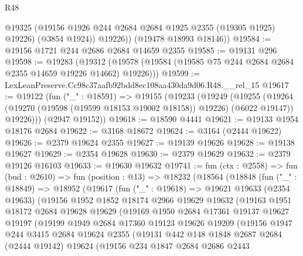 \begin{lexlean}{R48}
\begin{coremodule}
            @19325
            (@19156 @1926 @244 @2684 @2684 @1925 @2355 (@19305 @1925) @19226)
            (@3854 @1924))
          @19226))
      (@19478 @18993 @18146))
@19584 := @19156 @1721 @244 @2686 @2684 @14659 @2355
@19585 := @19131 @296
@19598 := @19283
    (@19312 (@19578 (@19584 (@19585 @75 @244 @2684 @2684 @2355 @14659 @19226 @14662) @19226)))
@19599 := LexLeanPreserve.Cc98c37aafb92bdd8ec108aa430da9d06.R48.__rel_15
@19617 := @19122
    (fun ("_" : @18591) =>
    @19155
      (@19233
        (@19249
          (@19255
            (@19264 (@19270 (@19598 (@19599 @18153 @19002 @18158)) @19226) (@6022 @19147))
            @19226)))
      (@2947 @19152))
@19618 := @18590 @4441
@19621 := @19133 @1954 @18176 @2684
@19622 := @3168 @18672
@19624 := @3164 (@2444 @19622)
@19626 := @2379 @19624 @2355
@19627 := @19139 @19626
@19628 := @19138 @19627
@19629 := @2354 @19628
@19630 := @2379 @19629
@19632 := @2379 @19126 @16103
@19633 := @19630 @19632
@19741 := fun (ctx : @2558) =>
  fun (bud : @2610) =>
  fun (position : @13) =>
  @18232
    (@18564
      (@18848
        (fun ("_" : @18849) =>
        @18952
          (@19617
            (fun ("_" : @19618) =>
            @19621
              @19633
              (@2354 @19633)
              (@19156
                @1952
                @1852
                @18174
                @2966
                @19629
                @19632
                (@19163
                  @1951
                  @18172
                  @2684
                  @19628
                  @19629
                  (@19169
                    @1950
                    @2684
                    @17361
                    @19137
                    @19627
                    @19197
                    (@19199
                      @1949
                      @2684
                      @17360
                      @19123
                      @19626
                      @19209
                      (@19156
                        @1947
                        @244
                        @3415
                        @2684
                        @19624
                        @2355
                        (@19131
                          @442
                          @148
                          @1848
                          @2687
                          @2684
                          (@2444 @19142)
                          @19624
                          (@19156
                            @234
                            @1847
                            @2684
                            @2686
                            @2443

\end{coremodule}
\end{lexlean}
